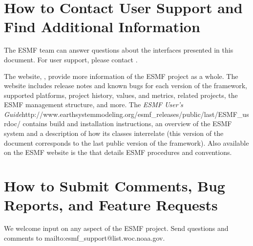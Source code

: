 \section{How to Contact User Support and Find Additional Information}
\label{sec:Support}
The ESMF team can answer questions about the interfaces presented in this 
document.  For user support, please contact 
.  

The website, , provide more information of the ESMF project as a whole.
The website includes release notes and known bugs for each version of the
framework, supported platforms, project history, values, and metrics, related projects,
the ESMF management structure, and more.  The \htmladdnormallink
{{\it ESMF User's Guide}}{http://www.earthsystemmodeling.org/esmf\_releases/public/last/ESMF\_usrdoc/} contains build and installation instructions, an overview of the ESMF system and a description of 
how its classes interrelate (this version of the document corresponds to the last public version of the framework).  Also available on the ESMF website is the 
that details ESMF procedures and conventions.  
 
\section{How to Submit Comments, Bug Reports, and Feature Requests}
\label{sec:Submission}
We welcome input on any aspect of the ESMF project.  Send
questions and comments to 
\newline
{}
{mailto:esmf\_support@list.woc.noaa.gov}.







